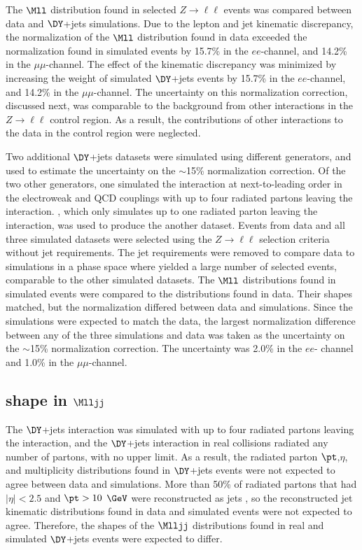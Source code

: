 The $\Mll$ distribution found in selected $Z\rightarrow \ell\ell$ events was compared between data and $\DY$+jets simulations.  Due to 
the lepton and jet kinematic discrepancy, the normalization of the $\Mll$ distribution found in data exceeded the normalization found in 
simulated events by 15.7\% in the $ee$-channel, and 14.2\% in the $\mu\mu$-channel.  The effect of the kinematic discrepancy was 
minimized by increasing the weight of simulated $\DY$+jets events by 15.7\% in the $ee$-channel, and 14.2\% in the $\mu\mu$-channel.  
The uncertainty on this normalization correction, discussed next, was comparable to the background from other interactions in the 
$Z \rightarrow \ell\ell$ control region.  As a result, the contributions of other interactions to the data in the control region were 
neglected.

Two additional $\DY$+jets datasets were simulated using different generators, and used to estimate the uncertainty on the $\sim$15\% 
\DY normalization correction.  Of the two other generators, one simulated the \DY interaction at next-to-leading order in the electroweak 
and QCD couplings with up to four radiated partons leaving the interaction.  \POWHEG, which only simulates up to one radiated parton leaving 
the \DY interaction, was used to produce the another dataset.  Events from data and all three simulated datasets were selected using the 
$Z \rightarrow \ell\ell$ selection criteria without jet requirements.  The jet requirements were removed to compare data to simulations in 
a phase space where \POWHEG yielded a large number of selected events, comparable to the other simulated datasets.  The $\Mll$ distributions 
found in simulated events were compared to the distributions found in data.  Their shapes matched, but the normalization differed between 
data and simulations.  Since the simulations were expected to match the data, the largest normalization difference between any of the three 
simulations and data was taken as the uncertainty on the $\sim$15\% normalization correction.  The uncertainty was 2.0\% in the $ee$-
channel and 1.0\% in the $\mu\mu$-channel.

\subsection{\DY shape in $\Mlljj$}
\label{sec:dyShapeInMlljj}
The $\DY$+jets interaction was simulated with up to four radiated partons leaving the \DY interaction, and the $\DY$+jets interaction in 
real collisions radiated any number of partons, with no upper limit.  As a result, the radiated parton $\pt$,$\eta$, and multiplicity 
distributions found in $\DY$+jets events were not expected to agree between data and simulations.  More than 50\% of radiated partons 
that had $|\eta| < 2.5$ and $\pt > 10$ $\GeV$ were reconstructed as jets \cite{pflowEventReco}, so the reconstructed jet kinematic 
distributions found in data and simulated events were not expected to agree.  Therefore, the shapes of the $\Mlljj$ distributions found in 
real and simulated $\DY$+jets events were expected to differ.

